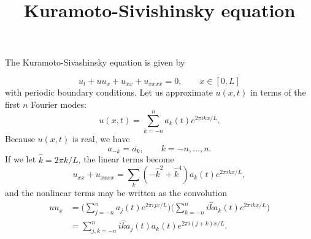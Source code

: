 \documentclass[11pt]{article}
\title{Kuramoto-Sivishinsky equation}
\begin{document}
The Kuramoto-Sivashinsky equation is given by

\begin{equation}
  \label{eq:1}
  u_t + u u_x + u_{xx} + u_{xxxx} = 0,\qquad x \in [0,L]
\end{equation}
with periodic boundary conditions.  Let us approximate $u(x,t)$ in terms of the
first $n$ Fourier modes:
\begin{equation}
  \label{eq:2}
  u(x,t) = \sum_{k=-n}^n a_k(t) e^{2\pi ikx/ L}.
\end{equation}
Because $u(x,t)$ is real, we have
\begin{equation}
  \label{eq:3}
  a_{-k} = \overline{a_k},\qquad k=-n,\ldots,n.
\end{equation}
If we let $\hat k = 2\pi k/L$, the linear terms become
\[u_{xx} + u_{xxxx} = \sum_k (-\hat k^2 + \hat k^4) a_k(t) e^{2\pi i k x/L},\]
and the nonlinear terms may be written as the convolution
\begin{align*}
  u u_x
  &= \bigg(\sum_{j=-n}^n a_j(t) e^{2\pi i jx/L}\bigg)\bigg(\sum_{k=-n}^n
    i\hat k a_k(t) e^{2\pi ikx/L}\bigg)\\
  &= \sum_{j,k=-n}^n i\hat k a_j(t) a_k(t) e^{2\pi i(j+k)x/L}.
\end{align*}
\end{document}
